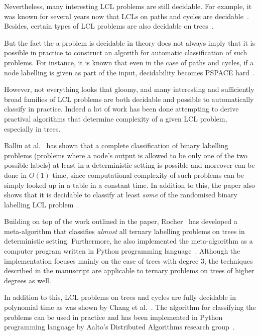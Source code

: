 Nevertheless, many interesting LCL problems are still decidable.
For example, it was known for several years now that LCLs
on paths and cycles are decidable~\cite{Balliu2018, Brandt2017, Naor1993}.
Besides, certain types of LCL problems are also decidable on
trees~\cite{Chang2017}.

But the fact the a problem is decidable in theory does not
always imply that it is possible in practice to
construct an algorith for automatic classification of
such problems. For instance, it is known that even in
the case of paths and cycles, if a node labelling is
given as part of the input, decidability becomes
PSPACE hard~\cite{Balliu2018}.

However, not everything looks that gloomy, and many
interesting and sufficiently broad families of LCL
problems are both decidable and possible to
automatically classify in practice. Indeed a lot of work
has been done attempting to derive practival algorithms
that determine complexity of a given LCL problem,
especially in trees.

Balliu at al.~\cite{Balliu2019c} has shown that a complete classification
of binary labelling problems (problems where a node's
output is allowed to be only one of the two possible labels)
at least in a deterministic setting is possible and moreover
can be done in $O(1)$ time, since computational
complexity of such problems can be simply looked up in a
table in a constant time. In addition
to this, the paper also shows that it is decidable to
classify at least \emph{some} of the randomised binary labelling
LCL problem~\cite{Balliu2019c}.

Building on top of the work outlined in the paper, Rocher~\cite{Rocher2020clas}
has developed a meta-algorithm that classifies \emph{almost}
all ternary labelling problems on trees in deterministic
setting. Furthermore,
he also implemented the meta-algorithm as a
computer program written in Python programming language~\cite{Rocher2020doc}.
Although the implementation focuses mainly on the case of trees with degree 3,
the techniques described in the manuscript are applicable to ternary problems
on trees of higher degrees as well.

In addition to this, LCL problems on trees and cycles
are fully decidable in polynomial time as was shown by Chang et al.~\cite{Chang2020}.
The algorithm for classifying the problems can be used in practice and has
been implemented in Python programming language by Aalto's
Distributed Algorithms research group~\cite{Tereshchenko2020}.

